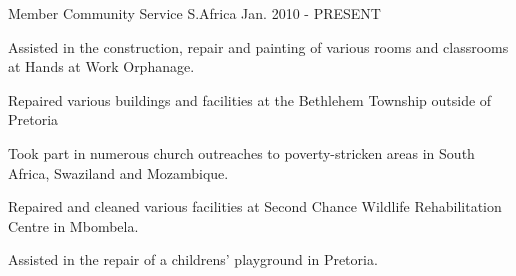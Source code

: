 \begin{cventries}
  \cventry
    {Member} %
    {Community Service} %
    {S.Africa} %
    {Jan. 2010 - PRESENT} %
    {
      \begin{cvitems} %
        \item {Assisted in the construction, repair and painting of various rooms and classrooms at Hands at Work Orphanage.}
        \item {Repaired various buildings and facilities at the Bethlehem Township outside of Pretoria}
        \item {Took part in numerous church outreaches to poverty-stricken areas in South Africa, Swaziland and Mozambique.}
        \item {Repaired and cleaned various facilities at Second Chance Wildlife Rehabilitation Centre in Mbombela.}
        \item {Assisted in the repair of a childrens' playground in Pretoria.}
      \end{cvitems}
    }

\end{cventries}
